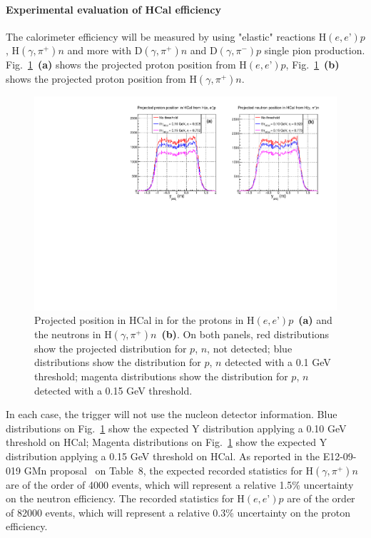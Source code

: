 \paragraph{Experimental evaluation of HCal efficiency}

The calorimeter efficiency will be measured by using "elastic" reactions H$(e,e’)p$, H$(\gamma,\pi^+)n$
and more with D$(\gamma,\pi^+)n$ and D$(\gamma,\pi^-)p$ single pion production.
Fig.~\ref{fig:Nproj}~{\bf(a)} shows the projected proton position from H$(e,e’)p$, 
Fig.~\ref{fig:Nproj}~{\bf(b)} shows the projected proton position from H$(\gamma,\pi^+)n$.
%
\begin{figure}[!h]
  \centering
  \includegraphics[width=12cm]{Answers_Readers/ProtVsNeut_CalibYproj.pdf}
  \caption{Projected position in HCal in for the protons in H$(e,e’)p$~{\bf(a)} and the neutrons in H$(\gamma,\pi^+)n$~{\bf(b)}. On both panels, red distributions show the projected distribution for $p$, $n$, not detected; blue distributions show the distribution for $p$, $n$ detected with a 0.1 GeV threshold; magenta distributions show the distribution for $p$, $n$ detected with a 0.15 GeV threshold.}
  \label{fig:Nproj}
\end{figure}
%
In each case, the trigger will not use the nucleon detector information.
Blue distributions on Fig.~\ref{fig:Nproj} show the expected Y distribution applying a 0.10 GeV threshold on HCal;
Magenta distributions on Fig.~\ref{fig:Nproj} show the expected Y distribution applying a 0.15 GeV threshold on HCal.
As reported in the E12-09-019 GMn proposal~\cite{E12-09-019} on Table~8, the expected recorded statistics for H$(\gamma,\pi^+)n$ are of the order of 4000 events, which will represent a relative 1.5\% uncertainty on the neutron efficiency. The recorded statistics for H$(e,e’)p$ are of the order of 82000 events, which will represent a relative 0.3\% uncertainty on the proton efficiency.\\

